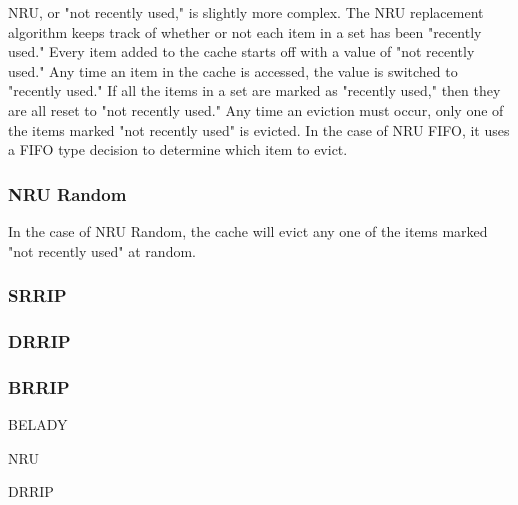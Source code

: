 NRU, or "not recently used," is slightly more complex.  The NRU replacement algorithm keeps track of whether or not each item in a set has been "recently used."  Every item added to the cache starts off with a value of "not recently used."  Any time an item in the cache is accessed, the value is switched to "recently used."  If all the items in a set are marked as "recently used," then they are all reset to "not recently used."  Any time an eviction must occur, only one of the items marked "not recently used" is evicted.  In the case of NRU FIFO, it uses a FIFO type decision to determine which item to evict.

\subsubsection{NRU Random}

In the case of NRU Random, the cache will evict any one of the items marked "not recently used" at random.

\subsubsection{SRRIP}



\subsubsection{DRRIP}



\subsubsection{BRRIP}




\label{sec:policies}
BELADY

NRU

DRRIP
